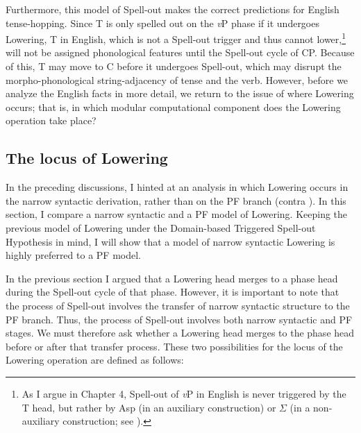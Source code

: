 Furthermore, this model of Spell-out makes the correct predictions for English tense-hopping. Since T is only spelled out on the {\it v}P phase if it undergoes Lowering, T in English, which is not a Spell-out trigger and thus cannot lower,\footnote{As I argue in Chapter 4, Spell-out of {\it v}P in English is never triggered by the T head, but rather by Asp (in an auxiliary construction) or $\Sigma$ (in a non-auxiliary construction; see ).} will not be assigned phonological features until the Spell-out cycle of CP. Because of this, T may move to C before it undergoes Spell-out, which may disrupt the morpho-phonological string-adjacency of tense and the verb. However, before we analyze the English facts in more detail, we return to the issue of where Lowering occurs; that is, in which modular computational component does the Lowering operation take place?

\subsection{The locus of Lowering} \label{loc_low_sec}
In the preceding discussions, I hinted at an analysis in which Lowering occurs in the narrow syntactic derivation, rather than on the PF branch (contra ). In this section, I compare a narrow syntactic and a PF model of Lowering. Keeping the previous model of Lowering under the Domain-based Triggered Spell-out Hypothesis in mind, I will show that a model of narrow syntactic Lowering is highly preferred to a PF model.

In the previous section I argued that a Lowering head merges to a phase head during the Spell-out cycle of that phase. However, it is important to note that the process of Spell-out involves the transfer of narrow syntactic structure to the PF branch. Thus, the process of Spell-out involves both narrow syntactic and PF stages. We must therefore ask whether a Lowering head merges to the phase head before or after that transfer process. These two possibilities for the locus of the Lowering operation are defined as follows:

